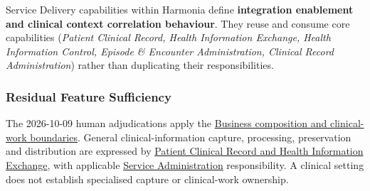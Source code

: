 Service Delivery capabilities within Harmonia define \textbf{integration enablement and clinical context correlation behaviour}. They reuse and consume core capabilities (\emph{Patient Clinical Record, Health Information Exchange, Health Information Control, Episode \& Encounter Administration, Clinical Record Administration}) rather than duplicating their responsibilities.

\label{rad:sd:14}



\label{rad:sd:16}
\subsubsection*{Residual Feature Sufficiency}
\label{rad:sd:18}

The 2026-10-09 human adjudications apply the \hyperref[rad:metamodel:167]{Business composition and clinical-work boundaries}. General clinical-information capture, processing, preservation and distribution are expressed by \hyperref[rad:ise:34]{Patient Clinical Record and Health Information Exchange}, with applicable \hyperref[rad:sa]{Service Administration} responsibility. A clinical setting does not establish specialised capture or clinical-work ownership.

